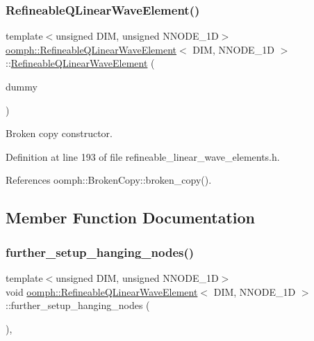 \subsubsection{\texorpdfstring{Refineable\+Q\+Linear\+Wave\+Element()}{RefineableQLinearWaveElement()}\hspace{0.1cm}{\footnotesize\ttfamily [2/2]}}
{\footnotesize\ttfamily template$<$unsigned D\+IM, unsigned N\+N\+O\+D\+E\+\_\+1D$>$ \\
\hyperlink{classoomph_1_1RefineableQLinearWaveElement}{oomph\+::\+Refineable\+Q\+Linear\+Wave\+Element}$<$ D\+IM, N\+N\+O\+D\+E\+\_\+1D $>$\+::\hyperlink{classoomph_1_1RefineableQLinearWaveElement}{Refineable\+Q\+Linear\+Wave\+Element} (\begin{DoxyParamCaption}\item[{const \hyperlink{classoomph_1_1RefineableQLinearWaveElement}{Refineable\+Q\+Linear\+Wave\+Element}$<$ D\+IM, N\+N\+O\+D\+E\+\_\+1D $>$ \&}]{dummy }\end{DoxyParamCaption})\hspace{0.3cm}{\ttfamily [inline]}}



Broken copy constructor. 



Definition at line 193 of file refineable\+\_\+linear\+\_\+wave\+\_\+elements.\+h.



References oomph\+::\+Broken\+Copy\+::broken\+\_\+copy().



\subsection{Member Function Documentation}
\mbox{\label{classoomph_1_1RefineableQLinearWaveElement_a10ed42f88be49442a29cc4feafd46149}} 
\subsubsection{\texorpdfstring{further\+\_\+setup\+\_\+hanging\+\_\+nodes()}{further\_setup\_hanging\_nodes()}}
{\footnotesize\ttfamily template$<$unsigned D\+IM, unsigned N\+N\+O\+D\+E\+\_\+1D$>$ \\
void \hyperlink{classoomph_1_1RefineableQLinearWaveElement}{oomph\+::\+Refineable\+Q\+Linear\+Wave\+Element}$<$ D\+IM, N\+N\+O\+D\+E\+\_\+1D $>$\+::further\+\_\+setup\+\_\+hanging\+\_\+nodes (\begin{DoxyParamCaption}{ }\end{DoxyParamCaption})\hspace{0.3cm}{\ttfamily [inline]}, {\ttfamily [virtual]}}



